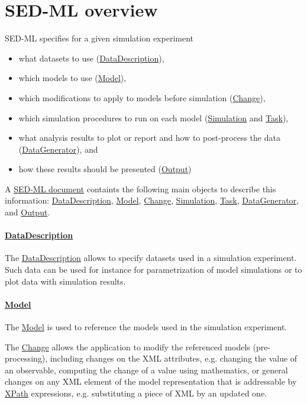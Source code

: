 \section{SED-ML overview}
SED-ML specifies for a given simulation experiment

\begin{itemize}
\item what datasets to use (\hyperref[class:dataDescription]{DataDescription}),
\item which models to use (\hyperref[class:model]{Model}),
\item which modifications to apply to models before simulation (\hyperref[class:change]{Change}),
\item which simulation procedures to run on each model (\hyperref[class:simulation]{Simulation} and \hyperref[class:task]{Task}),
\item what analysis results to plot or report and how to post-process the data (\hyperref[class:dataGenerator]{DataGenerator}), and
\item how these results should be presented (\hyperref[class:output]{Output})
\end{itemize}

A \hyperref[class:sed-ml]{SED-ML document} containts the following main objects to describe this information: \hyperref[class:dataDescription]{DataDescription}, \hyperref[class:model]{Model}, \hyperref[class:change]{Change}, \hyperref[class:simulation]{Simulation}, \hyperref[class:task]{Task}, \hyperref[class:dataGenerator]{DataGenerator}, and \hyperref[class:output]{Output}.

\paragraph*{\hyperref[class:dataDescription]{DataDescription}}
The \hyperref[class:dataDescription]{DataDescription} allows to specify datasets used in a simulation experiment. Such data can be used for instance for parametrization of model simulations or to plot data with simulation results.

\paragraph*{\hyperref[class:model]{Model}}
The \hyperref[class:model]{Model} is used to reference the models used in the simulation experiment.

The \hyperref[class:change]{Change} allows the application to modify the referenced models (pre-processing), including changes on the XML attributes, e.g. changing the value of an observable, computing the change of a value using mathematics, or general changes on any XML element of the model representation that is addressable by \hyperref[sec:xpath]{XPath} expressions, e.g. substituting a piece of XML by an updated one.

